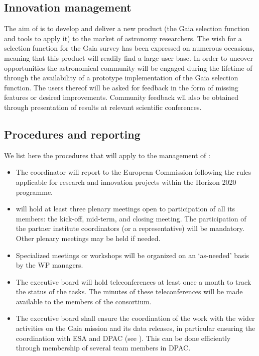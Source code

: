 \subsection{Innovation management}
\label{sec:innovationmgmt}

The aim of {\acro} is to develop and deliver a new product (the Gaia selection function and tools to apply it) to the market of astronomy researchers. The wish for a selection function for the Gaia survey has been expressed on numerous occasions, meaning that this product will readily find a large user base. In order to uncover opportunities the astronomical community will be engaged during the lifetime of {\acro} through the availability of a prototype implementation of the Gaia selection function. The users thereof will be asked for feedback in the form of missing features or desired improvements. Community feedback wll also be obtained through presentation of {\acro} results at relevant scientific conferences.

\subsection{Procedures and reporting}
\label{sec:procedures}

We list here the procedures that will apply to the management of {\acro}:
\begin{itemize}
    \item The {\acro} coordinator will report to the European Commission following the rules applicable for research and innovation projects within the Horizon 2020 programme.
    \item {\acro} will hold at least three plenary meetings open to participation of all its members: the kick-off, mid-term, and closing meeting. The participation of the partner institute coordinators (or a representative) will be mandatory. Other plenary meetings may be held if needed.
    \item Specialized meetings or workshops will be organized on an `as-needed' basis by the WP managers.
    \item The executive board will hold teleconferences at least once a month to track the status of the tasks. The minutes of these teleconferences will be made available to the members of the consortium.
    \item The executive board shall ensure the coordination of the {\acro} work with the wider activities on the Gaia mission and its data releases, in particular ensuring the coordination with ESA and DPAC (see ). This can be done efficiently through membership of several {\acro} team members in DPAC.
\end{itemize}

